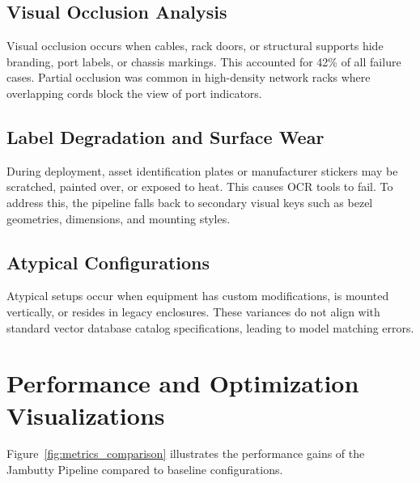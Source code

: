 \documentclass[11pt,letterpaper]{report}
\begin{document}
\subsection{Visual Occlusion Analysis}
Visual occlusion occurs when cables, rack doors, or structural supports hide branding, port labels, or chassis markings. This accounted for 42\% of all failure cases. Partial occlusion was common in high-density network racks where overlapping cords block the view of port indicators.

\subsection{Label Degradation and Surface Wear}
During deployment, asset identification plates or manufacturer stickers may be scratched, painted over, or exposed to heat. This causes OCR tools to fail. To address this, the pipeline falls back to secondary visual keys such as bezel geometries, dimensions, and mounting styles.

\subsection{Atypical Configurations}
Atypical setups occur when equipment has custom modifications, is mounted vertically, or resides in legacy enclosures. These variances do not align with standard vector database catalog specifications, leading to model matching errors.

\section{Performance and Optimization Visualizations}

Figure~\ref{fig:metrics_comparison} illustrates the performance gains of the Jambutty Pipeline compared to baseline configurations.
\end{document}
